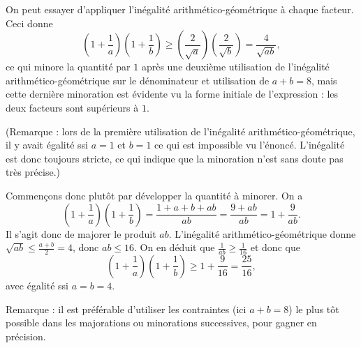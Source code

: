 \begin{Soln}{65}
On peut essayer d'appliquer l'inégalité arithmético-géométrique à chaque facteur. Ceci donne
\[
\left(1+\frac1a\right)\left(1+\frac1b\right)
\geq
\left(\frac{2}{\sqrt a}\right)\left(\frac{2}{\sqrt b}\right)
= \frac{4}{\sqrt{ab}},
\]
ce qui minore la quantité par $1$ après une deuxième utilisation de l'inégalité arithmético-géométrique sur le dénominateur et utilisation de $a+b=8$, mais cette dernière minoration est évidente vu la forme initiale de l'expression : les deux facteurs sont supérieurs à $1$.

(Remarque : lors de la première utilisation de l'inégalité arithmético-géométrique, il y avait égalité ssi $a=1$ et $b=1$ ce qui est impossible vu l'énoncé. L'inégalité est donc toujours stricte, ce qui indique que la minoration n'est sans doute pas très précise.)

Commençons donc plutôt par développer la quantité à minorer. On a
\[ \left(1+\frac1a\right)\left(1+\frac1b\right)
=
\frac{1+a+b+ab}{ab} = \frac{9+ab}{ab} = 1+\frac{9}{ab}.\]
Il s'agit donc de majorer le produit $ab$. L'inégalité arithmético-géométrique donne $\sqrt{ab} \leq \frac{a+b}{2}=4$, donc $ab\leq 16$. On en déduit que $\frac{1}{ab} \geq \frac{1}{16}$ et donc que
\[
\left(1+\frac1a\right)\left(1+\frac1b\right) \geq 1+\frac{9}{16} = \frac{25}{16},
\]
avec égalité ssi $a=b=4$.

Remarque : il est préférable d'utiliser les contraintes (ici $a+b=8$) le plus tôt possible dans les majorations ou minorations successives, pour gagner en précision.
\end{Soln}
